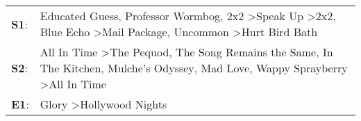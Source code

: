 \begin{supertabular}{p{0.03\textwidth}p{0.92\textwidth}}
 \textbf{S1}:  &  Educated Guess\textsuperscript{}, \enspace Professor Wormbog\textsuperscript{}, \enspace 2x2\textsuperscript{} \textgreater \enspace Speak Up\textsuperscript{} \textgreater \enspace 2x2\textsuperscript{}, \enspace Blue Echo\textsuperscript{} \textgreater \enspace Mail Package\textsuperscript{}, \enspace Uncommon\textsuperscript{} \textgreater \enspace Hurt Bird Bath\textsuperscript{}  \enspace  \\
 \textbf{S2}:  &                                All In Time\textsuperscript{} \textgreater \enspace The Pequod\textsuperscript{}, \enspace The Song Remains the Same\textsuperscript{}, \enspace In The Kitchen\textsuperscript{}, \enspace Mulche's Odyssey\textsuperscript{}, \enspace Mad Love\textsuperscript{}, \enspace Wappy Sprayberry\textsuperscript{} \textgreater \enspace All In Time\textsuperscript{}  \enspace  \\
 \textbf{E1}:  &                                                                                                                                                                                                                                                                                                                    Glory\textsuperscript{} \textgreater \enspace Hollywood Nights\textsuperscript{}  \enspace  \\
\end{supertabular}

